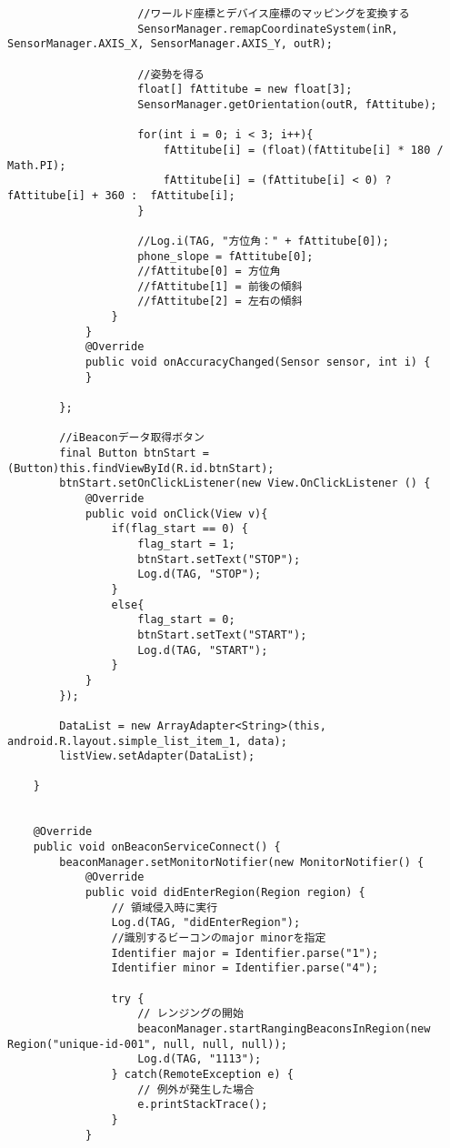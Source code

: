 \documentclass[11pt,a4j]{jarticle}
\begin{document}
\begin{verbatim}
                    //ワールド座標とデバイス座標のマッピングを変換する
                    SensorManager.remapCoordinateSystem(inR, SensorManager.AXIS_X, SensorManager.AXIS_Y, outR);

                    //姿勢を得る
                    float[] fAttitube = new float[3];
                    SensorManager.getOrientation(outR, fAttitube);

                    for(int i = 0; i < 3; i++){
                        fAttitube[i] = (float)(fAttitube[i] * 180 / Math.PI);
                        fAttitube[i] = (fAttitube[i] < 0) ? fAttitube[i] + 360 :  fAttitube[i];
                    }

                    //Log.i(TAG, "方位角：" + fAttitube[0]);
                    phone_slope = fAttitube[0];
                    //fAttitube[0] = 方位角
                    //fAttitube[1] = 前後の傾斜
                    //fAttitube[2] = 左右の傾斜
                }
            }
            @Override
            public void onAccuracyChanged(Sensor sensor, int i) {
            }

        };

        //iBeaconデータ取得ボタン
        final Button btnStart = (Button)this.findViewById(R.id.btnStart);
        btnStart.setOnClickListener(new View.OnClickListener () {
            @Override
            public void onClick(View v){
                if(flag_start == 0) {
                    flag_start = 1;
                    btnStart.setText("STOP");
                    Log.d(TAG, "STOP");
                }
                else{
                    flag_start = 0;
                    btnStart.setText("START");
                    Log.d(TAG, "START");
                }
            }
        });

        DataList = new ArrayAdapter<String>(this, android.R.layout.simple_list_item_1, data);
        listView.setAdapter(DataList);

    }


    @Override
    public void onBeaconServiceConnect() {
        beaconManager.setMonitorNotifier(new MonitorNotifier() {
            @Override
            public void didEnterRegion(Region region) {
                // 領域侵入時に実行
                Log.d(TAG, "didEnterRegion");
                //識別するビーコンのmajor minorを指定
                Identifier major = Identifier.parse("1");
                Identifier minor = Identifier.parse("4");

                try {
                    // レンジングの開始
                    beaconManager.startRangingBeaconsInRegion(new Region("unique-id-001", null, null, null));
                    Log.d(TAG, "1113");
                } catch(RemoteException e) {
                    // 例外が発生した場合
                    e.printStackTrace();
                }
            }


\end{verbatim}
\end{document}

